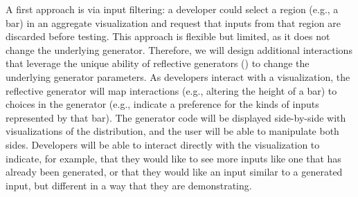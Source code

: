 { A first approach is via input filtering: a developer could
select a region (e.g., a bar) in an aggregate visualization and request that
inputs from that region are discarded before testing. This approach is flexible
but limited, as it does not change the underlying generator.
%
Therefore, we will design additional interactions that leverage the unique
ability of reflective generators
() to change the underlying
generator parameters. As developers interact with a visualization,
the reflective generator will map interactions (e.g., altering the height of a bar)
to choices
in the generator (e.g., indicate a preference for the kinds of inputs represented by that bar).  The generator code will be displayed
side-by-side with visualizations of the distribution, and the user
will be able to manipulate both sides.
Developers will be able to interact directly with the visualization to
indicate, for example, that they would like to see more inputs like
one that has already
been generated, or that they would like an input similar to a generated input,
but different in a way that they are demonstrating.







}
